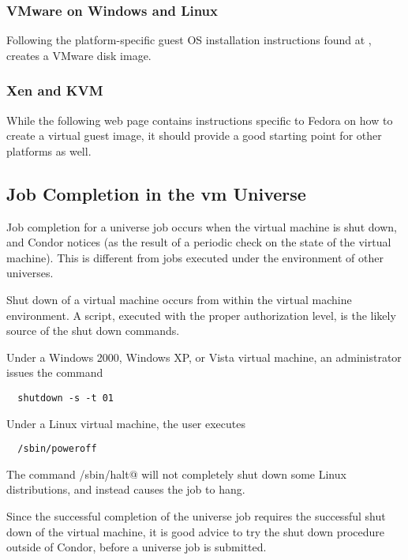 \subsubsection{\label{sec:vm-disk-image-details-vmware}
VMware on Windows and Linux}

Following the platform-specific
guest OS installation instructions found at
,
creates a VMware disk image.

\subsubsection{\label{sec:vm-disk-image-details-xen}Xen and KVM}
While the following web page contains instructions specific to
Fedora on how to create a virtual guest image,
it should provide a good starting point for 
other platforms as well.


\subsection{\label{sec:vm-job-completion-details}Job Completion in the vm Universe}

Job completion for a  universe job occurs when 
the virtual machine is shut down, and Condor notices 
(as the result of a periodic check on the state of the virtual machine).
This is different from jobs executed under the environment of other 
universes.

Shut down of a virtual machine occurs from within the virtual
machine environment.
A script, executed with the proper authorization level,
is the likely source of the shut down commands.

Under a Windows 2000, Windows XP, or Vista virtual machine,
an administrator issues the command
\begin{verbatim}
  shutdown -s -t 01
\end{verbatim}

Under a Linux virtual machine,
the  user executes
\begin{verbatim}
  /sbin/poweroff
\end{verbatim}
The command \verb@/sbin/halt@ will not completely
shut down some Linux distributions, and instead
causes the job to hang.

Since the successful completion of the  universe job
requires the successful shut down of the virtual machine,
it is good advice to try the shut down procedure outside of
Condor, before a  universe job is submitted.


